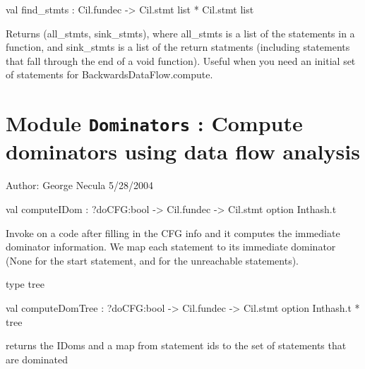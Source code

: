 \documentclass[11pt]{article}
\begin{document}
\label{val:Dataflow.find-underscorestmts}\begin{ocamldoccode}
val find_stmts : Cil.fundec -> Cil.stmt list * Cil.stmt list
\end{ocamldoccode}
\begin{ocamldocdescription}
Returns (all\_stmts, sink\_stmts), where all\_stmts is a list of the 
  statements in a function, and sink\_stmts is a list of the return statments
  (including statements that fall through the end of a void function).  
  Useful when you need an initial set of statements for
  BackwardsDataFlow.compute.


\end{ocamldocdescription}


\section{Module {\tt{Dominators}} : Compute dominators using data flow analysis}
\label{module:Dominators}




\ocamldocvspace{0.5cm}



Author: George Necula   
      5/28/2004 




\label{val:Dominators.computeIDom}\begin{ocamldoccode}
val computeIDom : ?doCFG:bool -> Cil.fundec -> Cil.stmt option Inthash.t
\end{ocamldoccode}
\begin{ocamldocdescription}
Invoke on a code after filling in the CFG info and it computes the 
 immediate dominator information. We map each statement to its immediate 
 dominator (None for the start statement, and for the unreachable 
 statements).


\end{ocamldocdescription}




\label{type:Dominators.tree}\begin{ocamldoccode}
type tree 
\end{ocamldoccode}




\label{val:Dominators.computeDomTree}\begin{ocamldoccode}
val computeDomTree :
  ?doCFG:bool -> Cil.fundec -> Cil.stmt option Inthash.t * tree
\end{ocamldoccode}
\begin{ocamldocdescription}
returns the IDoms and a map from statement ids to 
  the set of statements that are dominated


\end{ocamldocdescription}
\end{document}
